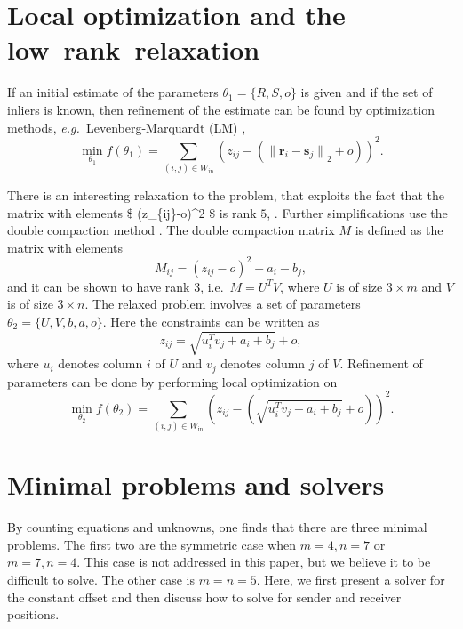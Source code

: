\documentclass[
]{book}
\providecommand{\norm}[1]{\lVert#1\rVert}
\def\eg{\emph{e.g.\ }}
\def\Win{W_{\text{in}}}
\begin{document}
\section{Local optimization and the low~rank~relaxation}
\label{sec:rank}
\vspace{-5pt}

If an initial estimate of the parameters \(\theta_1 = \{ R, S, o \}\) is given and if the set of inliers is known, then refinement of the estimate can be found by optimization methods, \eg Levenberg-Marquardt (LM) \cite{levenberg1944method,marquardt1963algorithm},
\begin{equation}
\min_{\theta_1} f(\theta_1) = \sum_{(i,j) \in \Win} (z_{ij} - ( {\norm{\mathbf{r}_i - \mathbf{s}_j}}_2 +o) )^2 .
\end{equation}

There is an interesting relaxation to the problem, that exploits the fact that the matrix with elements \$ (z\_\{ij\}-o)\^{}2 \$ is rank \(5\), \cite{pollefeys-nister-icassp-08}. Further simplifications use the double compaction method \cite{kuang2013stratified}. The double compaction matrix \(M\) is defined as the matrix with elements
\begin{equation}
M_{ij}=(z_{ij}-o)^2 -a_i-b_j,
\label{eq:dc}
\end{equation}
and it can be shown to have rank \(3\), i.e.~\(M = U^T V\), where \(U\) is of size \(3 \times m\) and \(V\) is of size \(3 \times n\).
The relaxed problem involves a set of parameters
\(\theta_2 = \{ U, V, b, a, o \}\). Here the constraints can be written as
\begin{equation}
z_{ij} =  \sqrt{u_i^T v_j + a_i + b_j} + o ,
\end{equation}
where \(u_i\) denotes column \(i\) of \(U\) and \(v_j\) denotes column \(j\) of \(V\).
Refinement of parameters can be done by performing local optimization on
\begin{equation}
\min_{\theta_2} f(\theta_2) = \sum_{(i,j) \in \Win} \left ( z_{ij} - ( \sqrt{u_i^T v_j + a_i + b_j} + o ) \right )^2 .
\label{eq:relaxed}
\end{equation}

\vspace{-5pt}
\section{Minimal problems and solvers}
\label{sec:minimal}
\vspace{-5pt}

By counting equations and unknowns, one finds that there are three minimal problems. The first two are the symmetric case when \(m=4, n=7\) or \(m=7, n=4\). This case is not addressed in this paper, but we believe it to be difficult to solve. The other case is \(m=n= 5\). Here, we first present a solver for the constant offset and then discuss how to solve for sender and receiver positions.
\end{document}
